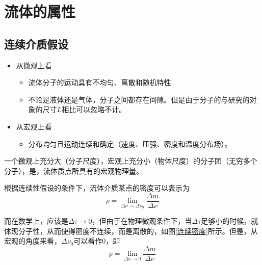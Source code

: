 \section{流体的属性}
\thispagestyle{empty}
\subsection{连续介质假设}
\begin{itemize}
	\item 从微观上看
	\begin{itemize}
		\item 流体分子的运动具有不均匀、离散和随机特性
		\item 不论是液体还是气体，分子之间都存在间隙。但是由于分子的与研究的对象的尺寸$L$相比可以忽略不计。
	\end{itemize}
	\item 从宏观上看
	\begin{itemize}
		\item 分布均匀且运动连续和确定（速度、压强、密度和温度分布场）。
	\end{itemize}
\end{itemize}


\dyb[流体质点] 一个微观上充分大（分子尺度），宏观上充分小（物体尺度）的分子团（无穷多个分子），是，流体质点所具有的宏观物理量。
\vspace*{0.5em}


根据连续性假设的条件下，流体介质某点的密度可以表示为
\begin{equation}
	\rho = \lim\limits_{\Delta \nu \to \Delta \nu_0}\dfrac{\Delta m}{\Delta \nu}
\end{equation}

而在数学上，应该是$\Delta \tau \to 0$，但由于在物理微观条件下，当$\Delta \tau$足够小的时候，就体现分子性，从而使得密度不连续，而是离散的，如图\ref{连续密度}所示。但是，从宏观的角度来看，$\Delta \nu_0 $可以看作0，即
\begin{equation}
	\rho = \lim\limits_{\Delta \nu \to 0}\dfrac{\Delta m}{\Delta \nu}
\end{equation}
\vspace*{-2em}

